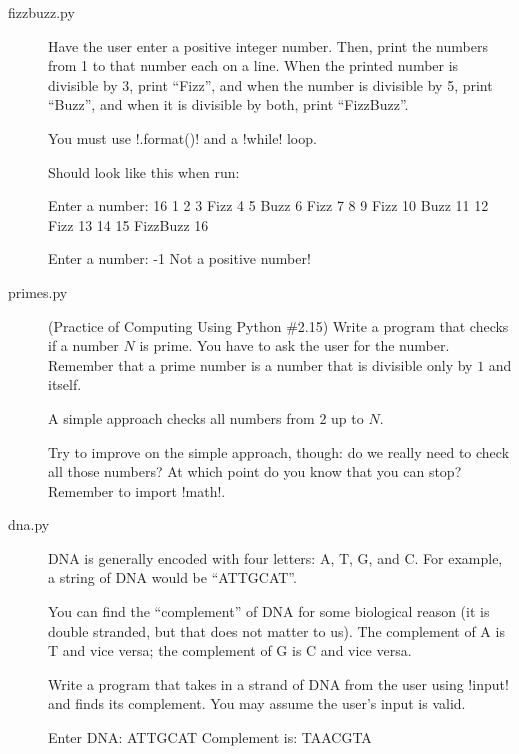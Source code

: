 \documentclass[11pt]{cselabheader}
\begin{document}
\begin{description}
  \item[fizzbuzz.py] Have the user enter a positive integer number. Then, print
    the numbers from 1 to that number each on a line. When the printed number is
    divisible by 3, print ``Fizz'', and when the number is divisible by 5, print
    ``Buzz'', and when it is divisible by both, print ``FizzBuzz''.

    You must use \pythoninline!.format()! and a \pythoninline!while! loop.

    Should look like this when run:

    \begin{verbatimcode}
Enter a number: 16
1
2
3 Fizz
4
5 Buzz
6 Fizz
7
8
9 Fizz
10 Buzz
11
12 Fizz
13
14
15 FizzBuzz
16
    \end{verbatimcode}

    \begin{verbatimcode}
Enter a number: -1
Not a positive number!
    \end{verbatimcode}


  \item[primes.py] (Practice of Computing Using Python \#2.15) Write a program
    that checks if a number $N$ is prime. You have to ask the user for the
    number. Remember that a prime
    number is a number that is divisible only by $1$ and itself.

    A simple approach checks all numbers from $2$ up to $N$.

    Try to improve on the simple approach, though: do we really need to check
    all those numbers? At which point do you know that you can stop? Remember to
    import \pythoninline!math!.

  \item[dna.py] 
    DNA is generally encoded with four letters: A, T, G, and C. For example, a
    string of DNA would be ``ATTGCAT''.

    You can find the ``complement'' of DNA for some biological reason (it is
    double stranded, but that does not matter to us). The complement of A is T
    and vice versa; the complement of G is C and vice versa.

    Write a program that takes in a strand of DNA from the user using
    \pythoninline!input! and finds its complement. You may assume the user's
    input is valid.

    \begin{verbatimcode}
Enter DNA: ATTGCAT
Complement is: TAACGTA
    \end{verbatimcode}

\end{description}
\end{document}
